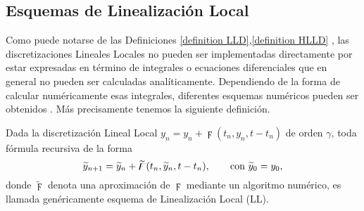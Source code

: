 

\subsection{Esquemas de Linealización Local}

Como puede notarse de las Definiciones \ref{definition LLD},\ref{definition HLLD} , las
discretizaciones Lineales Locales no pueden ser implementadas directamente por
estar expresadas en término de integrales o ecuaciones diferenciales que en general no pueden ser
calculadas analíticamente. Dependiendo de la forma de calcular  numéricamente esas integrales,
 diferentes esquemas numéricos pueden ser obtenidos \cite{Jimenez05AMC,Jimenez13}.
 Más precisamente tenemos la siguiente definición.
\begin{definition}
	\label{definition LLS} Dada la discretización Lineal Local 
	  $y_n=y_{n}+\digamma(t_{n},y_{n},t-t_{n})$
	 de orden $\gamma $, toda fórmula recursiva de la forma 
	\begin{equation*}
	 \widetilde{y}_{n+1}=\widetilde{y}_{n}+\widetilde{\digamma}(t_{n},\widetilde{y}_{n},t-t_{n})
	 , \text{ \ \ \ \
		\ con }\widetilde{y}_{0}=y_{0},
	\end{equation*}%
	donde $\widetilde{\digamma}$ denota una aproximación
	de $\digamma$ mediante un algoritmo numérico, es
	llamada genéricamente esquema de Linealización Local (LL).
\end{definition}

